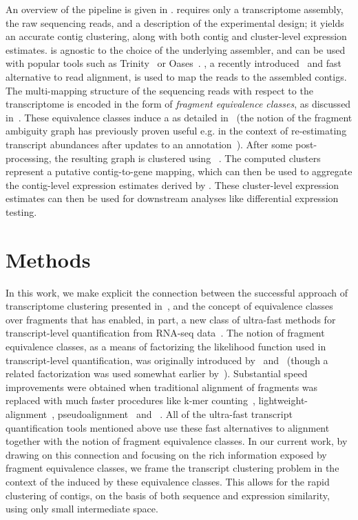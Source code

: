 An overview of the \rapclust pipeline is given in . \rapclust requires only a transcriptome assembly, the raw sequencing reads, and a description of the experimental design; it yields an accurate contig clustering, along with both contig and cluster-level expression estimates. \rapclust is agnostic to the choice of the underlying \denovo assembler, and can be used with popular tools such as Trinity~\cite{trinity} or Oases~\cite{oases}. \Qm, a recently introduced~\citep{rapmap} and fast alternative to read alignment, is used to map the reads to the assembled contigs. The multi-mapping structure of the sequencing reads with respect to the transcriptome is encoded in the form of \textit{fragment equivalence classes}, as discussed in~. These equivalence classes induce a \ambiggraph as detailed in~ (the notion of the fragment ambiguity graph has previously proven useful e.g. in the context of re-estimating transcript abundances after updates to an annotation~\citep{reexpress}). After some post-processing, the resulting graph is clustered using \mcl~\citep{mcl}. The computed clusters represent a putative contig-to-gene mapping, which can then be used to aggregate the contig-level expression estimates derived by \sailfish.  These cluster-level expression estimates can then be used for downstream analyses like differential expression testing.

\section{Methods}
\label{sec:methods}

In this work, we make explicit the connection between the successful approach of \denovo transcriptome clustering presented in~\cite{corset}, and the concept of equivalence classes over fragments that has enabled, in part, a new class of ultra-fast methods for transcript-level quantification from RNA-seq data~\cite{sailfish, salmon, kallisto}.  The notion of fragment equivalence classes, as a means of factorizing the likelihood function used in transcript-level quantification, was originally introduced by~\citet{isoem} and~\citet{mmseq} (though a related factorization was used somewhat earlier by~\citet{jiang}). Substantial speed improvements were obtained when traditional alignment of fragments was replaced with much faster procedures like k-mer counting~\citep{sailfish}, lightweight-alignment~\citep{salmon}, pseudoalignment~\citep{kallisto} and \qm~\citep{rapmap}.  All of the ultra-fast transcript quantification tools mentioned above use these fast alternatives to alignment together with the notion of fragment equivalence classes. In our current work, by drawing on this connection and focusing on the rich information exposed by fragment equivalence classes, we frame the transcript clustering problem in the context of the \ambiguitygraph induced by these equivalence classes. This allows for the rapid clustering of contigs, on the basis of both sequence and expression similarity, using only small intermediate space.

